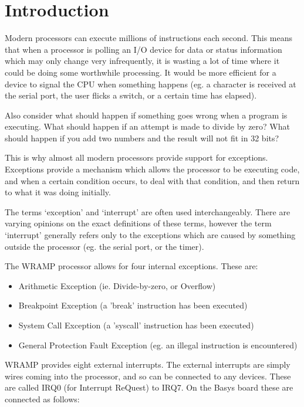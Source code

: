 \section{Introduction}

Modern processors can execute millions of instructions each
second. This means that when a processor is polling an I/O device for
data or status information which may only change very infrequently, it
is wasting a lot of time where it could be doing some worthwhile
processing.  It would be more efficient for a device to signal the CPU
when something happens (eg. a character is received at the serial
port, the user flicks a switch, or a certain time has elapsed).

Also consider what should happen if something goes wrong when a
program is executing. What should happen if an attempt is made to
divide by zero? What should happen if you add two numbers and the
result will not fit in 32 bits?

This is why almost all modern processors provide support for
exceptions. Exceptions provide a mechanism which allows the processor
to be executing code, and when a certain condition occurs, to deal
with that condition, and then return to what it was doing initially.

The terms `exception' and `interrupt' are often used
interchangeably. There are varying opinions on the exact definitions of
these terms, however the term `interrupt' generally refers only to the
exceptions which are caused by something outside the processor
(eg. the serial port, or the timer).

The WRAMP processor allows for four internal exceptions. These are:

\begin{itemize}
\item Arithmetic Exception (ie. Divide-by-zero, or Overflow)
\item Breakpoint Exception (a 'break' instruction has been executed)
\item System Call Exception (a 'syscall' instruction has been
executed)
\item General Protection Fault Exception (eg. an illegal instruction
is encountered)
\end{itemize}

WRAMP provides eight external interrupts. The external interrupts are 
simply wires coming into the processor, and so can be connected to any 
devices.  These are called IRQ0 (for Interrupt ReQuest) to IRQ7. On the 
Basys board these are connected as follows:

